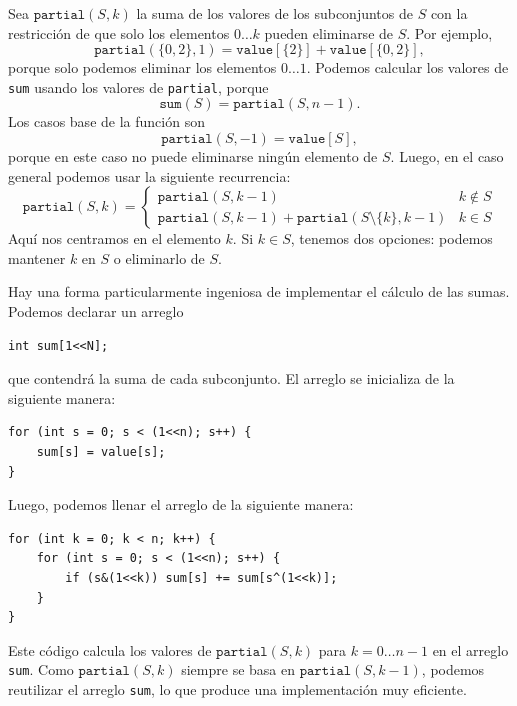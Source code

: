 Sea $\texttt{partial}(S,k)$ la suma de los
valores de los subconjuntos de $S$ con la restricción
de que solo los elementos $0 \ldots k$
pueden eliminarse de $S$.
Por ejemplo,
\[\texttt{partial}(\{0,2\},1)=\texttt{value}[\{2\}]+\texttt{value}[\{0,2\}],\]
porque solo podemos eliminar los elementos $0 \ldots 1$.
Podemos calcular los valores de \texttt{sum} usando
los valores de \texttt{partial}, porque
\[\texttt{sum}(S) = \texttt{partial}(S,n-1).\]
Los casos base de la función son
\[\texttt{partial}(S,-1)=\texttt{value}[S],\]
porque en este caso no puede eliminarse ningún elemento de $S$.
Luego, en el caso general podemos usar la siguiente recurrencia:
\begin{equation*}
    \texttt{partial}(S,k) = \begin{cases}
               \texttt{partial}(S,k-1) & k \notin S \\
               \texttt{partial}(S,k-1) + \texttt{partial}(S \setminus \{k\},k-1) & k \in S
           \end{cases}
\end{equation*}
Aquí nos centramos en el elemento $k$.
Si $k \in S$, tenemos dos opciones: podemos mantener $k$ en $S$
o eliminarlo de $S$.

Hay una forma particularmente ingeniosa de implementar el
cálculo de las sumas. Podemos declarar un arreglo
\begin{lstlisting}
int sum[1<<N];
\end{lstlisting}
que contendrá la suma de cada subconjunto.
El arreglo se inicializa de la siguiente manera:
\begin{lstlisting}
for (int s = 0; s < (1<<n); s++) {
    sum[s] = value[s];
}
\end{lstlisting}
Luego, podemos llenar el arreglo de la siguiente manera:
\begin{lstlisting}
for (int k = 0; k < n; k++) {
    for (int s = 0; s < (1<<n); s++) {
        if (s&(1<<k)) sum[s] += sum[s^(1<<k)];
    }
}
\end{lstlisting}
Este código calcula los valores de $\texttt{partial}(S,k)$
para $k=0 \ldots n-1$ en el arreglo \texttt{sum}.
Como $\texttt{partial}(S,k)$ siempre se basa en
$\texttt{partial}(S,k-1)$, podemos reutilizar el arreglo
\texttt{sum}, lo que produce una implementación muy eficiente.
